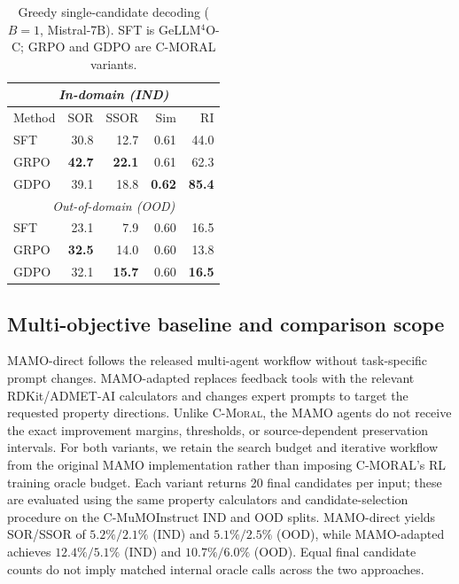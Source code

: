 \begin{table}[t]
\centering
\caption{Greedy single-candidate decoding ($B=1$, Mistral-7B). SFT is GeLLM$^4$O-C; GRPO and GDPO are C-MORAL variants.}
\label{tab:single_candidate}
\footnotesize
\setlength{\tabcolsep}{3pt}
\renewcommand{\arraystretch}{0.95}
\begin{tabular}{@{}lrrrr@{}}
\toprule
\multicolumn{5}{c}{\textit{In-domain (IND)}} \\
\midrule
Method & SOR & SSOR & Sim & RI \\
\midrule
SFT & 30.8 & 12.7 & 0.61 & 44.0 \\
GRPO & \textbf{42.7} & \textbf{22.1} & 0.61 & 62.3 \\
GDPO & 39.1 & 18.8 & \textbf{0.62} & \textbf{85.4} \\
\midrule
\multicolumn{5}{c}{\textit{Out-of-domain (OOD)}} \\
\midrule
SFT & 23.1 & 7.9 & 0.60 & 16.5 \\
GRPO & \textbf{32.5} & 14.0 & 0.60 & 13.8 \\
GDPO & 32.1 & \textbf{15.7} & 0.60 & \textbf{16.5} \\
\bottomrule
\end{tabular}
\end{table}

\subsection{Multi-objective baseline and comparison scope}
\label{appendix:mamo}
MAMO-direct follows the released multi-agent workflow without task-specific prompt changes. MAMO-adapted replaces feedback tools with the relevant RDKit/ADMET-AI calculators and changes expert prompts to target the requested property directions. Unlike \textsc{C-Moral}, the MAMO agents do not receive the exact improvement margins, thresholds, or source-dependent preservation intervals. For both variants, we retain the search budget and iterative workflow from the original MAMO implementation rather than imposing C-MORAL's RL training oracle budget. Each variant returns 20 final candidates per input; these are evaluated using the same property calculators and candidate-selection procedure on the C-MuMOInstruct IND and OOD splits. MAMO-direct yields SOR/SSOR of $5.2\%/2.1\%$ (IND) and $5.1\%/2.5\%$ (OOD), while MAMO-adapted achieves $12.4\%/5.1\%$ (IND) and $10.7\%/6.0\%$ (OOD). Equal final candidate counts do not imply matched internal oracle calls across the two approaches.

